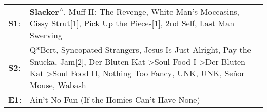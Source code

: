 \begin{supertabular}{p{0.03\textwidth}p{0.92\textwidth}}
 \textbf{S1}:  &                                                                                                                                                                                                                                                                                  \textbf{Slacker\textsuperscript{$\wedge$}}, \enspace Muff II: The Revenge\textsuperscript{}, \enspace White Man's Moccasins\textsuperscript{}, \enspace Cissy Strut[1]\textsuperscript{}, \enspace Pick Up the Pieces[1]\textsuperscript{}, \enspace 2nd Self\textsuperscript{}, \enspace Last Man Swerving\textsuperscript{}  \enspace  \\
 \textbf{S2}:  &  Q*Bert\textsuperscript{}, \enspace Syncopated Strangers\textsuperscript{}, \enspace Jesus Is Just Alright\textsuperscript{}, \enspace Pay the Snucka\textsuperscript{}, \enspace Jam[2]\textsuperscript{}, \enspace Der Bluten Kat\textsuperscript{} \textgreater \enspace Soul Food I\textsuperscript{} \textgreater \enspace Der Bluten Kat\textsuperscript{} \textgreater \enspace Soul Food II\textsuperscript{}, \enspace Nothing Too Fancy\textsuperscript{}, \enspace UNK\textsuperscript{}, \enspace UNK\textsuperscript{}, \enspace Señor Mouse\textsuperscript{}, \enspace Wabash\textsuperscript{}  \enspace  \\
 \textbf{E1}:  &                                                                                                                                                                                                                                                                                                                                                                                                                                                                                                                                                 Ain't No Fun (If the Homies Can't Have None)\textsuperscript{}  \enspace  \\
\end{supertabular}

